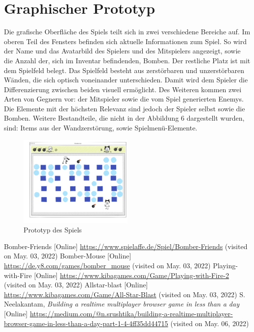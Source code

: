 \documentclass[conference]{IEEEtran}
\begin{document}
\section{Graphischer Prototyp}
Die grafische Oberfläche des Spiels teilt sich in zwei verschiedene Bereiche auf. Im oberen Teil des Fensters befinden sich aktuelle Informationen zum Spiel. So wird der Name und das Avatarbild des Spielers und des Mitspielers angezeigt, sowie die Anzahl der, sich im Inventar befindenden, Bomben. Der restliche Platz ist mit dem Spielfeld belegt. Das Spielfeld besteht aus zerstörbaren und unzerstörbaren Wänden, die sich optisch voneinander unterschieden. Damit wird dem Spieler die Differenzierung zwischen beiden visuell ermöglicht. Des Weiteren kommen zwei Arten von Gegnern vor: der Mitspieler sowie die vom Spiel generierten Enemys.
Die Elemente mit der höchsten Relevanz sind jedoch der Spieler selbst sowie die Bomben. Weitere Bestandteile, die nicht in der Abbildung 6 dargestellt wurden, sind: Items aus der Wandzerstörung, sowie Spielmenü-Elemente. 
\begin{figure}[H]
    \centering
    \includegraphics[width=0.5\textwidth]{res/prototyp.png}
    \caption{Prototyp des Spiels}
\end{figure}

\nocite{space-invaders}
\begin{thebibliography}{0}
	Bomber-Friends [Online] \url{https://www.spielaffe.de/Spiel/Bomber-Friends} (visited on May. 03, 2022)
	Bomber-Mouse [Online] \url{https://de.y8.com/games/bomber_mouse} (visited on May. 03, 2022)
	Playing-with-Fire [Online] \url{https://www.kibagames.com/Game/Playing-with-Fire-2 } (visited on May. 03, 2022)
	Allstar-blast [Online] \url{https://www.kibagames.com/Game/All-Star-Blast} (visited on May. 03, 2022)
	S. Neelakantam,	\textit{Building a realtime multiplayer browser game in less than a day} [Online] \url{https://medium.com/@n.srushtika/building-a-realtime-multiplayer-browser-game-in-less-than-a-day-part-1-4-4ff35dd44715} (visited on May. 06, 2022)

\end{thebibliography}
\vspace{12pt}
\end{document}
